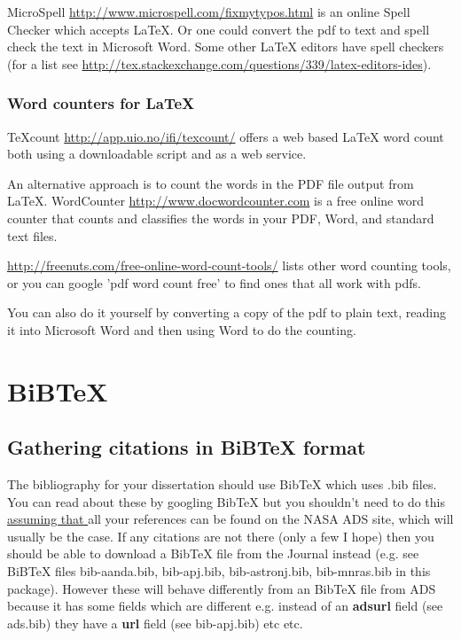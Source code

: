 \documentclass[twoside, fontsize=12pt,
     bibliography=totoc, %
     listof=totoc, %
     index=totoc, %
     onehalfspacing %
]{_MScDiss2017_cls}
\begin{document}
MicroSpell \url{http://www.microspell.com/fixmytypos.html}  is an online Spell Checker which accepts LaTeX.
Or one could convert the pdf to text and spell check the text in Microsoft Word. Some other LaTeX editors have spell checkers (for a list see 
\url{http://tex.stackexchange.com/questions/339/latex-editors-ides}). 

\subsection{Word counters for LaTeX}\label{sec:count}
TeXcount \url{http://app.uio.no/ifi/texcount/} offers a web based LaTeX word count both using a downloadable script and as a web service.

An alternative approach is to count the words in the PDF file output from LaTeX.
WordCounter \url{http://www.docwordcounter.com} is a free online word counter that counts and classifies the words in your PDF, Word, and standard text files.

\url{http://freenuts.com/free-online-word-count-tools/} lists other word counting tools, or you can google 'pdf word count free' to find ones that all work with pdfs. 

You can also do it yourself by converting a copy of the pdf to plain text, reading it into Microsoft Word and then using Word to do the counting.

\chapter{BiBTeX}
\label{chap:bibtex}
\section{Gathering citations in BiBTeX format}
\label{sec:gather}
The bibliography for your  dissertation should use BibTeX which uses .bib files. You can read about these by googling BibTeX but you shouldn't need to do this  \underline{assuming that }all your references can be found on the NASA ADS site, which will usually be the case. If any  citations are not there (only a few I hope) then you should be able to download a BibTeX file from the Journal instead (e.g. see BiBTeX files bib-aanda.bib,  bib-apj.bib, bib-astronj.bib, bib-mnras.bib in this package). However these will behave differently from an  BibTeX file from ADS because it has some fields which are different e.g. instead of an  {\normalfont\bfseries adsurl} field (see ads.bib) they have a {\normalfont\bfseries url} field (see bib-apj.bib)  etc etc.
\end{document}
